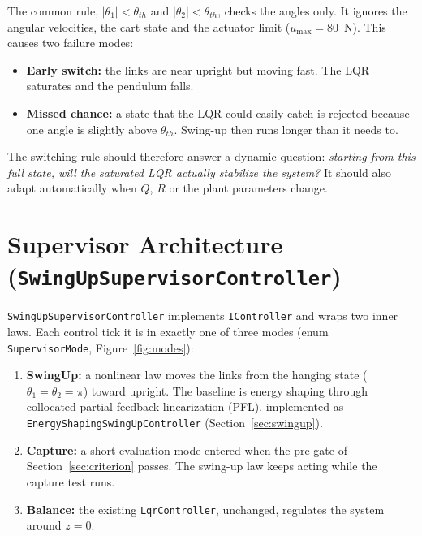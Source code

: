 \documentclass[11pt,a4paper]{article}
\newcommand{\code}[1]{\texttt{#1}}
\newcommand{\umax}{u_{\max}}
\begin{document}
The common rule, $|\theta_1| < \theta_{th}$ and $|\theta_2| < \theta_{th}$, checks the angles
only. It ignores the angular velocities, the cart state and the actuator limit
($\umax = 80$~N). This causes two failure modes:
\begin{itemize}
\item \textbf{Early switch:} the links are near upright but moving fast. The LQR saturates and
the pendulum falls.
\item \textbf{Missed chance:} a state that the LQR could easily catch is rejected because one
angle is slightly above $\theta_{th}$. Swing-up then runs longer than it needs to.
\end{itemize}
The switching rule should therefore answer a dynamic question: \emph{starting from this full
state, will the saturated LQR actually stabilize the system?} It should also adapt
automatically when $Q$, $R$ or the plant parameters change.

\section{Supervisor Architecture (\code{SwingUpSupervisorController})}
\code{SwingUpSupervisorController} implements \code{IController} and wraps two inner laws. Each
control tick it is in exactly one of three modes (enum \code{SupervisorMode},
Figure~\ref{fig:modes}):
\begin{enumerate}
\item \textbf{SwingUp:} a nonlinear law moves the links from the hanging state
($\theta_1 = \theta_2 = \pi$) toward upright. The baseline is energy shaping through collocated
partial feedback linearization (PFL), implemented as \code{EnergyShapingSwingUpController}
(Section~\ref{sec:swingup}).
\item \textbf{Capture:} a short evaluation mode entered when the pre-gate of
Section~\ref{sec:criterion} passes. The swing-up law keeps acting while the capture test runs.
\item \textbf{Balance:} the existing \code{LqrController}, unchanged, regulates the system
around $z = 0$.
\end{enumerate}
\end{document}
